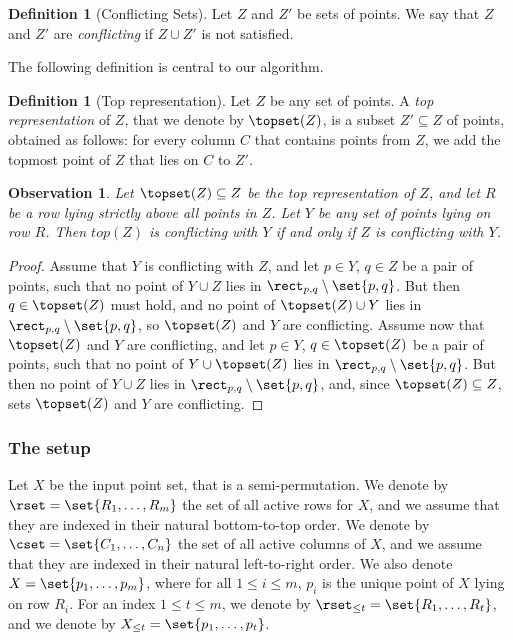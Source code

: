 \documentclass[11pt]{article}
\numberwithin{equation}{section}
\theoremstyle{definition}
\newtheorem{definition}[theorem]{Definition}
\theoremstyle{plain}
\newtheorem{myobs}[theorem]{Observation}
\begin{document}
\begin{definition}[Conflicting Sets]  
Let $Z$ and $Z'$ be sets of points. 
We say that $Z$ and $Z'$ are \emph{conflicting} if $Z \cup Z'$ is not satisfied. 
%
\end{definition} 



%
%

%
%
%
%
%


The following definition is central to our algorithm.

\begin{definition}[Top representation]  
Let $Z$ be any set of points.
A \emph{top representation} of $Z$, that we denote by $\topset(Z)$, is a subset $Z' \subseteq Z$ of points, obtained as follows: for every column $C$ that contains points from $Z$, we add the topmost point of $Z$ that lies on $C$ to $Z'$.
\end{definition} 

\begin{myobs} 
\label{obs:top points sufficient} 
Let $\topset(Z) \subseteq Z$ be the top representation of $Z$, and let $R$ be a row lying strictly above all points in $Z$. Let $Y$ be any set of points lying on row $R$. Then $top(Z)$ is conflicting with $Y$ if and only if $Z$ is conflicting with $Y$.  
\end{myobs} 
\begin{proof}
	Assume that $Y$ is conflicting with $Z$, and let $p\in Y$, $q\in Z$ be a pair of points, such that no point of $Y\cup Z$ lies in $\rect_{p,q}\setminus\set{p,q}$. But then $q\in \topset(Z)$ must hold, and no point of $\topset(Z)\cup Y$ lies in $\rect_{p,q}\setminus\set{p,q}$, so $\topset(Z)$ and $Y$ are conflicting.
	Assume now that $\topset(Z)$ and $Y$ are conflicting, and let $p\in Y$, $q\in \topset(Z)$ be a pair of points, such that no point of $Y\cup \topset(Z)$ lies in $\rect_{p,q}\setminus\set{p,q}$. But then no point of $Y\cup Z$ lies in $\rect_{p,q}\setminus\set{p,q}$, and, since $\topset(Z)\subseteq Z$, sets $\topset(Z)$ and $Y$ are conflicting.
\end{proof}




%



\subsubsection{The setup} 

Let $X$ be the input point set, that is a semi-permutation.
We denote by $\rset=\set{R_1,\ldots,R_m}$ the set of all active rows for $X$, and we assume that they are indexed in their natural bottom-to-top order. We denote by $\cset=\set{C_1,\ldots,C_n}$ the set of all active columns of $X$, and we assume that they are indexed in their natural left-to-right order. We also denote $X=\set{p_1,\ldots,p_m}$, where for all $1\leq i\leq m$, $p_i$ is the unique point of $X$ lying on row $R_i$.
For an index $1\leq t\leq m$, we denote by $\rset_{\leq t}=\set{R_1,\ldots,R_t}$, and we denote by $X_{\leq t}=\set{p_1,\ldots,p_t}$.
\end{document}
